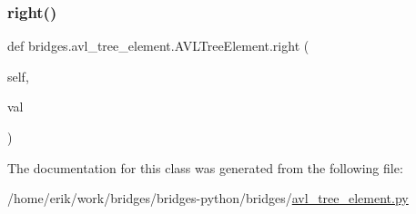 \subsubsection{\texorpdfstring{right()}{right()}\hspace{0.1cm}{\footnotesize\ttfamily [2/2]}}
{\footnotesize\ttfamily def bridges.\+avl\+\_\+tree\+\_\+element.\+A\+V\+L\+Tree\+Element.\+right (\begin{DoxyParamCaption}\item[{}]{self,  }\item[{}]{val }\end{DoxyParamCaption})}



The documentation for this class was generated from the following file\+:\begin{DoxyCompactItemize}
\item 
/home/erik/work/bridges/bridges-\/python/bridges/\hyperlink{avl__tree__element_8py}{avl\+\_\+tree\+\_\+element.\+py}\end{DoxyCompactItemize}
